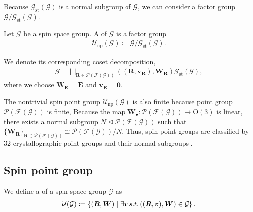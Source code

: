 Because $\mathcal{G}_{\mathrm{st}}(\mathcal{G})$ is a normal subgroup of $\mathcal{G}$, we can consider a factor group $\mathcal{G} / \mathcal{G}_{\mathrm{st}}(\mathcal{G})$.
\begin{screen}
  \begin{definition}
    Let $\mathcal{G}$ be a spin space group.
    A  of $\mathcal{G}$ is a factor group
    \begin{align}
      \mathcal{U}_{\mathrm{np}}(\mathcal{G}) \coloneqq \mathcal{G} / \mathcal{G}_{\mathrm{st}}(\mathcal{G}).
    \end{align}
  \end{definition}
\end{screen}

We denote its corresponding coset decomposition,
\begin{align}
  \label{eq:spin_space_group_coset}
  \mathcal{G}
    = \bigsqcup_{ \bm{R} \in \mathcal{P}(\mathcal{F}(\mathcal{G})) } ((\bm{R}, \bm{v}_{\bm{R}}), \bm{W}_{\bm{R}}) \mathcal{G}_{\mathrm{st}}(\mathcal{G}),
\end{align}
where we choose $\bm{W}_{\bm{E}} = \bm{E}$ and $\bm{v}_{\bm{E}} = \bm{0}$.

The nontrivial spin point group $\mathcal{U}_{\mathrm{np}}(\mathcal{G})$ is also finite because point group $\mathcal{P}(\mathcal{F}(\mathcal{G}))$ is finite,
Because the map $\bm{W}_{\bullet}: \mathcal{P}(\mathcal{F}(\mathcal{G})) \to \mathrm{O}(3)$ is linear, there exists a normal subgroup $N \trianglelefteq \mathcal{P}(\mathcal{F}(\mathcal{G}))$ such that $\{ \bm{W}_{\bm{R}} \}_{ \bm{R} \in \mathcal{P}(\mathcal{F}(\mathcal{G})) } \cong \mathcal{P}(\mathcal{F}(\mathcal{G})) / N$.
Thus, spin point groups are classified by 32 crystallographic point groups and their normal subgroups \cite{Litvin:a14103}.

\subsection{Spin point group}


We define a  of a spin space group $\mathcal{G}$ as
\begin{align}
    \mathcal{U}(\mathcal{G}) \coloneqq \left\{  (\bm{R}, \bm{W})  \mathrel{}\middle|\mathrel{}  \exists \bm{v} \,s.t.\, ((\bm{R}, \bm{v}), \bm{W}) \in \mathcal{G}  \right\}.
\end{align}

